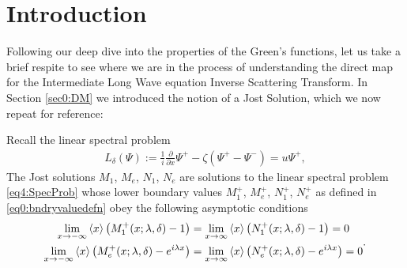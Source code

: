 \documentclass[../dissertation.tex]{subfiles}
\begin{document}
\setcounter{section}{-1}
\section{Introduction}\label{sec4.0:Intro}

Following our deep dive into the properties of the Green's functions, let us take
a brief respite to see where we are in the process of understanding the direct
map for the Intermediate Long Wave equation Inverse Scattering Transform. In Section
\ref{sec0:DM} we introduced the notion of a Jost Solution, which we now repeat for
reference: 
\begin{defn}\label{defn4:jost}
	Recall the linear spectral problem 
	\begin{align}\label{eq4:SpecProb}
		L_\delta (\Psi) 
			:= \frac{1}{i} \frac{\partial}{\partial x} \Psi^+ 
				- \zeta \left(\Psi^+ - \Psi^-\right) = u \Psi^+,
	\end{align}
	The Jost solutions $M_1$, $M_e$, $N_1$, $N_e$ are solutions to the linear 
	spectral problem \eqref{eq4:SpecProb} whose lower boundary values
	$M_1^+$, $M_e^+$, $N_1^+$, $N_e^+$ as defined in \eqref{eq0:bndryvaluedefn}
	obey the following asymptotic conditions
	\begin{subequations}\label{eq4:JostDEasymp}
		\begin{align}
			\lim_{x\to -\infty} 
					\inn{x} 
					\left( 
						M_1^+(x; \lambda, \delta) - 1 
					\right)
				&= \lim_{x\to \infty} 
						\inn{x} 
						\left( 
							N_1^+(x; \lambda, \delta) - 1
						\right)
				= 0 \\
			\lim_{x\to -\infty} 
					\inn{x} \left( 
						M_e^+(x; \lambda, \delta) - e^{i\lambda x}
					\right)
				&= \lim_{x\to \infty} 
						\inn{x} 
						\left( 
							N_e^+(x; \lambda, \delta) - e^{i\lambda x}
						\right)
				= 0
		\end{align}.
	\end{subequations}


\end{defn}
\end{document}
